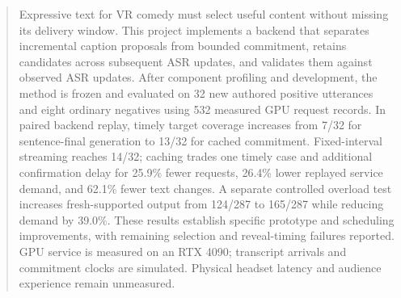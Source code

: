 \begin{abstract}
Expressive text for VR comedy must select useful content without missing its delivery window. This project implements a backend that separates incremental caption proposals from bounded commitment, retains candidates across subsequent ASR updates, and validates them against observed ASR updates. After component profiling and development, the method is frozen and evaluated on 32 new authored positive utterances and eight ordinary negatives using 532 measured GPU request records. In paired backend replay, timely target coverage increases from 7/32 for sentence-final generation to 13/32 for cached commitment. Fixed-interval streaming reaches 14/32; caching trades one timely case and additional confirmation delay for 25.9\% fewer requests, 26.4\% lower replayed service demand, and 62.1\% fewer text changes. A separate controlled overload test increases fresh-supported output from 124/287 to 165/287 while reducing demand by 39.0\%. These results establish specific prototype and scheduling improvements, with remaining selection and reveal-timing failures reported. GPU service is measured on an RTX 4090; transcript arrivals and commitment clocks are simulated. Physical headset latency and audience experience remain unmeasured.
\end{abstract}


